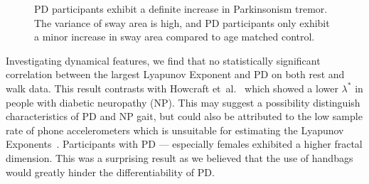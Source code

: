 \documentclass[12pt, twoside]{book}
\begin{document}
\begin{figure}[h]
\begin{subfigure}{.42\textwidth}
	\end{subfigure}
	\caption{PD participants exhibit a definite increase in Parkinsonism tremor. The variance of sway area is high, and PD participants only exhibit a minor increase in sway area compared to age matched control. }
	\label{basicrest}
\end{figure}

Investigating dynamical features, we find that no statistically significant correlation between the largest Lyapunov Exponent and PD on both rest and walk data. This result contrasts with Howcraft et~al.~\cite{howcroft2014analysisgaitlyapunov} which showed a lower $\lambda^*$ in people with diabetic neuropathy (NP). This may suggest a possibility distinguish characteristics of PD and NP gait, but could also be attributed to the low sample rate of phone accelerometers which is unsuitable for estimating the Lyapunov Exponents~\cite{rosenstein1993practicallyapunov}. Participants with PD --- especially females exhibited a higher fractal dimension. This was a surprising result as we believed that the use of handbags would greatly hinder the differentiability of PD.
\end{document}
